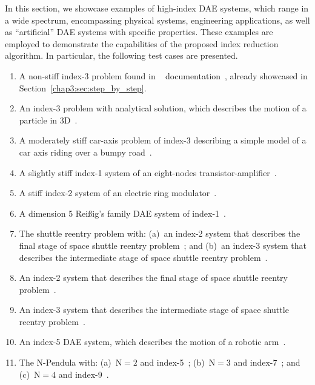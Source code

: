In this section, we showcase examples of high-index \ac{DAE} systems, which range in a wide spectrum, encompassing physical systems, engineering applications, as well as ``artificial'' \ac{DAE} systems with specific properties. These examples are employed to demonstrate the capabilities of the proposed index reduction algorithm. In particular, the following test cases are presented.
%
\begin{enumerate}
  \setlength{\itemsep}{0.0em}
  \item A non-stiff index-3 problem found in \Wolfram{}~\Mathematica{} documentation~\cite{mathematica}, already showcased in Section~\ref{chap3:sec:step_by_step}.
  \item An index-3 problem with analytical solution, which describes the motion of a particle in 3D~\cite{campbell1995constraint}.
  \item A moderately stiff car-axis problem of index-3 describing a simple model of a car axis riding over a bumpy road~\cite{lioen1998test, mazzia2008test}.
  \item A slightly stiff index-1 system of an eight-nodes transistor-amplifier~\cite{lioen1998test, mazzia2008test}.
  \item A stiff index-2 system of an electric ring modulator~\cite{lioen1998test, mazzia2008test}.
  \item A dimension 5 Rei{\ss}ig's family \ac{DAE} system of index-1~\cite{reissig2000differential}.
  \item The shuttle reentry problem with: (a)~an index-2 system that describes the final stage of space shuttle reentry problem~\cite{brenan1995numerical}; and (b)~an index-3 system that describes the intermediate stage of space shuttle reentry problem~\cite{brenan1995numerical}.
  \item An index-2 system that describes the final stage of space shuttle reentry problem~\cite{brenan1995numerical}.
  \item An index-3 system that describes the intermediate stage of space shuttle reentry problem~\cite{brenan1995numerical}.
  \item An index-5 \ac{DAE} system, which describes the motion of a robotic arm~\cite{pryce1998solving}.
  \item The $\mathrm{N}$-Pendula with: (a)~$\mathrm{N} = 2$ and index-5~\cite{pryce1998solving}; (b)~$\mathrm{N} = 3$ and index-7~\cite{nedialkov2008solvingIII}; and (c)~$\mathrm{N} = 4$ and index-9~\cite{nedialkov2008solvingIII}.
\end{enumerate}

